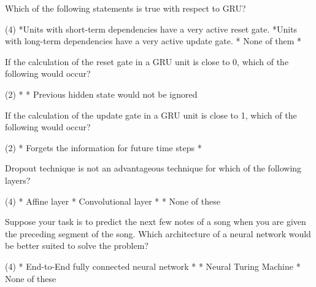 \documentclass[10pt]{extarticle}
\begin{document}
\begin{exercise}
    Which of the following statements is true with respect to GRU?
    \begin{choice} (4)
        *Units with short-term dependencies have a very active reset gate.
        *Units with long-term dependencies have a very active update gate.
        * None of them
        * 
    \end{choice}
\end{exercise}
\begin{solution}
\end{solution}

\begin{exercise}
    If the calculation of the reset gate in a GRU unit is close to 0, which of the following would occur?
    \begin{choice} (2)
        *
        * Previous hidden state would not be ignored
    \end{choice}
\end{exercise}
\begin{solution}
\end{solution}

\begin{exercise}
    If the calculation of the update gate in a GRU unit is close to 1, which of the following would occur?
    \begin{choice} (2)
        * Forgets the information for future time steps
        *
    \end{choice}
\end{exercise}
\begin{solution}
\end{solution}

\begin{exercise}
    Dropout technique is not an advantageous technique for which of the following layers?
    \begin{choice} (4)
        * Affine layer
        * Convolutional layer
        *
        * None of these
    \end{choice}
\end{exercise}
\begin{solution}
\end{solution}

\begin{exercise}
    Suppose your task is to predict the next few notes of a song when you are given the preceding segment of the song. Which architecture of a neural network would be better suited to solve the problem?
    \begin{choice} (4)
        * End-to-End fully connected neural network
        * 
        * Neural Turing Machine
        * None of these
    \end{choice}
\end{exercise}
\begin{solution}
\end{solution}
\end{document}
